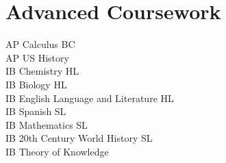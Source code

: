 \documentclass[12pt]{article}
\begin{document}
%

\section*{Advanced Coursework}
AP Calculus BC \\
AP US History \\
IB Chemistry HL \\
IB Biology HL \\
IB English Language and Literature HL \\
IB Spanish SL \\
IB Mathematics SL \\
IB 20th Century World History SL \\
IB Theory of Knowledge



\end{document}
